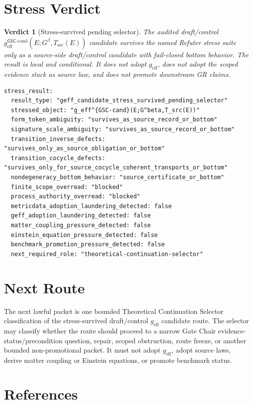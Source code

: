 \documentclass[11pt]{article}
\newcommand{\Gbeta}{G^\beta}
\newcommand{\geff}{g_{\mathrm{eff}}}
\newcommand{\geffCand}{g_{\mathrm{eff}}^{\mathsf{GSC}\mbox{-}\mathrm{cand}}}
\newtheorem{verdict}{Verdict}
\begin{document}
\section{Stress Verdict}

\begin{verdict}[Stress-survived pending selector]
The audited draft/control \(\geffCand(E;\Gbeta,T_{\mathrm{src}}(E))\)
candidate survives the named Refuter stress suite only as a source-side
draft/control candidate with fail-closed bottom behavior. The result is local
and conditional. It does not adopt \(\geff\), does not adopt the scoped
evidence stack as source law, and does not promote downstream GR claims.
\end{verdict}

\begin{verbatim}
stress_result:
  result_type: "geff_candidate_stress_survived_pending_selector"
  stressed_object: "g_eff^{GSC-cand}(E;G^beta,T_src(E))"
  form_token_ambiguity: "survives_as_source_record_or_bottom"
  signature_scale_ambiguity: "survives_as_source_record_or_bottom"
  transition_inverse_defects: "survives_only_as_source_obligation_or_bottom"
  transition_cocycle_defects: "survives_only_for_source_cocycle_coherent_transports_or_bottom"
  nondegeneracy_bottom_behavior: "source_certificate_or_bottom"
  finite_scope_overread: "blocked"
  process_authority_overread: "blocked"
  metricdata_adoption_laundering_detected: false
  geff_adoption_laundering_detected: false
  matter_coupling_pressure_detected: false
  einstein_equation_pressure_detected: false
  benchmark_promotion_pressure_detected: false
  next_required_role: "theoretical-continuation-selector"
\end{verbatim}

\section{Next Route}

The next lawful packet is one bounded Theoretical Continuation Selector
classification of the stress-survived draft/control \(\geff\) candidate
route. The selector may classify whether the route should proceed to a narrow
Gate Chair evidence-status/precondition question, repair, scoped obstruction,
route freeze, or another bounded non-promotional packet. It must not adopt
\(\geff\), adopt source laws, derive matter coupling or Einstein equations, or
promote benchmark status.

\section*{References}
\end{document}
